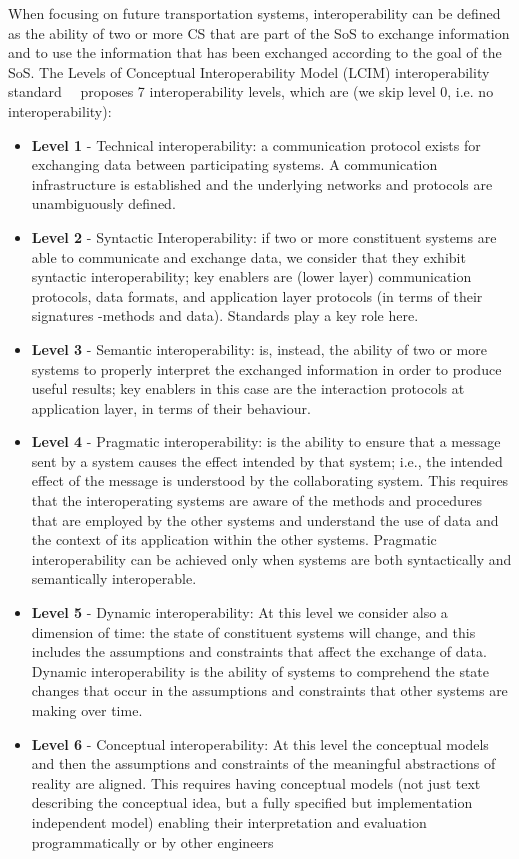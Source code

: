 When focusing on future transportation systems, interoperability can be defined as the ability of two or more CS that are part of the SoS to exchange information and to use the information that has been exchanged according to the goal of the SoS. The Levels of Conceptual Interoperability Model (LCIM) interoperability standard~~\cite{Wang2009,Tolk2006} proposes 7 interoperability levels, which are (we skip level 0,
i.e. no interoperability):

\begin{itemize}
\item {\bf Level 1} - Technical interoperability: a communication protocol exists for exchanging data between participating systems. A communication infrastructure is established and the underlying networks and protocols are unambiguously defined.

\item {\bf Level 2} - Syntactic Interoperability: if two or more constituent systems are able to communicate and exchange data, we consider that they exhibit syntactic interoperability; key enablers are (lower layer) communication protocols, data formats, and application layer protocols (in terms of their signatures -methods and data). Standards play a key role here.

\item {\bf Level 3} - Semantic interoperability: is, instead, the ability of two or more systems to properly interpret the exchanged information in order to produce useful results; key enablers in this case are the interaction protocols at application layer, in terms of their behaviour.

\item {\bf Level 4} - Pragmatic interoperability: is the ability to ensure that a message sent by a system causes the effect intended by that system; i.e., the intended effect of the message is understood by the collaborating system. This requires that the interoperating systems are aware of the methods and procedures that are employed by the other systems and understand the use of data and the context of its application within the other systems. Pragmatic interoperability can be achieved only when systems are both syntactically and semantically interoperable.

\item {\bf Level 5} - Dynamic interoperability: At this level we consider also a dimension of time: the state of constituent systems will change, and this includes the assumptions and constraints that affect the exchange of data. Dynamic interoperability is the ability of systems to comprehend the state changes that occur in the assumptions and constraints that other systems are making over time.

\item {\bf Level 6} - Conceptual interoperability: At this level the conceptual models and then the assumptions and constraints of the meaningful abstractions of reality are aligned.
This requires having conceptual models (not just text describing the conceptual idea, but a fully specified but implementation independent model) enabling their interpretation and evaluation programmatically or by other engineers
\end{itemize}

